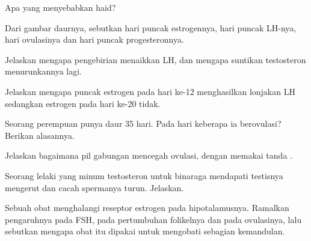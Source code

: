 \begin{exercise}[$\star$]\label{exo:g11:hormones-and-reproduction:5}
Apa yang menyebabkan haid?
\end{exercise}

\begin{exercise}[$\star\star$]\label{exo:g11:hormones-and-reproduction:6}
Dari gambar daurnya, sebutkan hari puncak estrogennya, hari puncak
LH-nya, hari ovulasinya dan hari puncak progesteronnya.
\end{exercise}

\begin{exercise}[$\star\star$]\label{exo:g11:hormones-and-reproduction:7}
Jelaskan mengapa pengebirian menaikkan LH, dan mengapa suntikan
testosteron menurunkannya lagi.
\end{exercise}

\begin{exercise}[$\star\star$]\label{exo:g11:hormones-and-reproduction:8}
Jelaskan mengapa puncak estrogen pada hari ke-12 menghasilkan lonjakan
LH sedangkan estrogen pada hari ke-20 tidak.
\end{exercise}

\begin{exercise}[$\star\star$]\label{exo:g11:hormones-and-reproduction:9}
Seorang perempuan punya daur 35 hari. Pada hari keberapa ia
berovulasi? Berikan alasannya.
\end{exercise}

\begin{exercise}[$\star\star$]\label{exo:g11:hormones-and-reproduction:10}
Jelaskan bagaimana pil gabungan mencegah ovulasi, dengan memakai tanda
.
\end{exercise}

\begin{exercise}[$\star\star$]\label{exo:g11:hormones-and-reproduction:11}
Seorang lelaki yang minum testosteron untuk binaraga mendapati
testisnya mengerut dan cacah spermanya turun. Jelaskan.
\end{exercise}

\begin{exercise}[$\star\star\star$]\label{exo:g11:hormones-and-reproduction:12}
Sebuah obat menghalangi reseptor estrogen pada hipotalamusnya.
Ramalkan pengaruhnya pada FSH, pada pertumbuhan folikelnya dan pada
ovulasinya, lalu sebutkan mengapa obat itu dipakai untuk mengobati
sebagian kemandulan.
\end{exercise}

